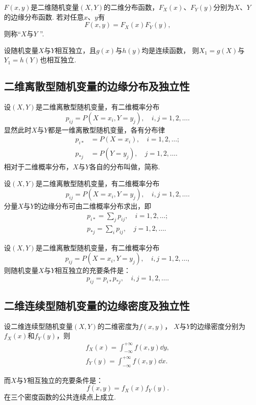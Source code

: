 \begin{definition}
\(F(x,y)\)是二维随机变量\((X,Y)\)的二维分布函数，\(F_X(x)\)、\(F_Y(y)\)分别为\(X\)、\(Y\)的边缘分布函数.
若对任意\(x\)、\(y\)有\[
F(x,y) = F_X(x) F_Y(y),
\]则称“\(X\)与\(Y\) ”.
\end{definition}

\begin{theorem}
设随机变量\(X\)与\(Y\)相互独立，且\(g(x)\)与\(h(y)\)均是连续函数，
则\(X_1 = g(X)\)与\(Y_1 = h(Y)\)也相互独立.
\end{theorem}

\subsection{二维离散型随机变量的边缘分布及独立性}
\begin{definition}
设\((X,Y)\)是二维离散型随机变量，有二维概率分布\[
p_{ij} = P(X=x_i,Y=y_j), \quad i,j=1,2,\dotsc.
\]显然此时\(X\)与\(Y\)都是一维离散型随机变量，各有分布律
\begin{align*}
p_{i*} &= P(X=x_i), \quad i=1,2,\dotsc; \\
p_{*j} &= P(Y=y_j), \quad j=1,2,\dotsc.
\end{align*}
相对于二维概率分布，\(X\)与\(Y\)各自的分布叫做，简称.
\end{definition}

\begin{theorem}
设\((X,Y)\)是二维离散型随机变量，有二维概率分布\[
p_{ij} = P(X=x_i,Y=y_j), \quad i,j=1,2,\dotsc.
\]分量\(X\)与\(Y\)的边缘分布可由二维概率分布求出，即
\begin{align*}
p_{i*} = \sum_{j}{p_{ij}}, \quad i=1,2,\dotsc; \\
p_{*j} = \sum_{i}{p_{ij}}, \quad j=1,2,\dotsc.
\end{align*}
\end{theorem}

\begin{theorem}
设\((X,Y)\)是二维离散型随机变量，有二维概率分布\[
p_{ij} = P(X=x_i,Y=y_j), \quad i,j=1,2,\dotsc,
\]则随机变量\(X\)与\(Y\)相互独立的充要条件是：\[
p_{ij} = p_{i*} p_{*j}, \quad i,j=1,2,\dotsc.
\]
\end{theorem}

\subsection{二维连续型随机变量的边缘密度及独立性}
\begin{theorem}
设二维连续型随机变量\((X,Y)\)的二维密度为\(f(x,y)\)，
\(X\)与\(Y\)的边缘密度分别为\(f_X(x)\)和\(f_Y(y)\)，则
\begin{align*}
f_X(x) = \int_{-\infty}^{+\infty} f(x,y) \dd{y}, \\
f_Y(y) = \int_{-\infty}^{+\infty} f(x,y) \dd{x}.
\end{align*}

而\(X\)与\(Y\)相互独立的充要条件是：\[
f(x,y) = f_X(x) f_Y(y).
\]在三个密度函数的公共连续点上成立.
\end{theorem}

